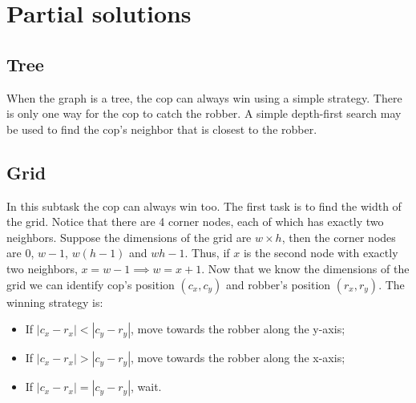\documentclass[a4paper,12pt]{article}
\begin{document}
\section*{Partial solutions}
\subsection*{Tree}
When the graph is a tree, the cop can always win using a simple strategy. There is only one way for the cop to catch the robber. A simple depth-first search may be used to find the cop's neighbor that is closest to the robber.

\subsection*{Grid}
In this subtask the cop can always win too. The first task is to find the width of the grid. Notice that there are 4 corner nodes, each of which has exactly two neighbors. Suppose the dimensions of the grid are $w\times h$, then the corner nodes are $0$, $w-1$, $w(h-1)$ and $wh-1$. Thus, if $x$ is the second node with exactly two neighbors, $x=w-1 \implies w=x+1$. Now that we know the dimensions of the grid we can identify cop's position $(c_x, c_y)$ and robber's position $(r_x, r_y)$. The winning strategy is:
\begin{itemize}
\item If $|c_x-r_x| < |c_y-r_y|$, move towards the robber along the y-axis;
\item If $|c_x-r_x| > |c_y-r_y|$, move towards the robber along the x-axis;
\item If $|c_x-r_x| = |c_y-r_y|$, wait.
\end{itemize}
\end{document}
